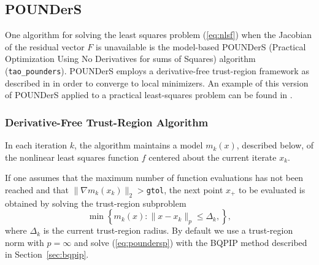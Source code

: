 \begin{comment}
Most solvers also require the Jacobian of this function.  
The routine that evaluates this matrix should be set
using the command {\tt Tao\-Set\-Jacobian\-Routine()}.

Using the constraint data provided by the user, the nonlinear
least squares solver formulates a minimization problem, and
solves the minimization problem using another TAO solver.  
A nonlinear least squares application should be solved with
the method \texttt{tao\_pounders} or \texttt{tao\_lm}.
\textbf{***** Jason, check the lm above. It would be great to include it
but otherwise say that we only have methods that do not use the Jacobian
and that if they have a Jacobian, they should use something else/the
next/beta version.}
\end{comment}

\subsection{POUNDerS}\label{sec:pounders}
One algorithm for solving the least squares problem (\ref{eq:nlsf}) when
the Jacobian of the residual vector $F$ is unavailable is the model-based
POUNDerS (Practical Optimization Using No Derivatives for
sums of Squares) algorithm (\texttt{tao\_pounders}). 
POUNDerS employs a derivative-free trust-region framework as described in
\cite{Dfobook} in order to converge to local minimizers. An example of
this version of POUNDerS applied to a
practical least-squares problem can be found in \cite{UNEDF0}.



\subsubsection{Derivative-Free Trust-Region Algorithm}
In each iteration $k$, the algorithm maintains a model $m_k(x)$,
described below, of the nonlinear least squares function $f$ centered about
the current iterate $x_k$. 

If one assumes that the maximum number of function evaluations has not been
reached and that $\|\nabla m_k(x_k)\|_2>$\texttt{gtol}, the next point 
$x_+$ to be evaluated is obtained by solving the trust-region subproblem 
\begin{equation}
 \min\left\{
 m_k(x) : 
 \|x-x_k\|_{p} \leq \Delta_k, 
 \right \}, 
 \label{eq:poundersp}
\end{equation}
where $\Delta_k$ is the current 
trust-region radius. By default we use a trust-region norm with $p=\infty$
and solve (\ref{eq:poundersp}) with the BQPIP method described in
Section~\ref{sec:bqpip}. 

